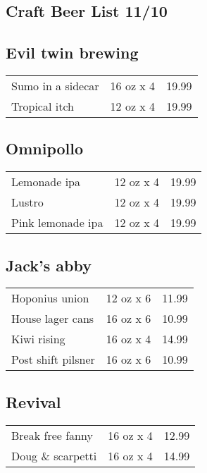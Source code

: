 \documentclass{article}%
\begin{document}
%
\pagestyle{empty}%
\normalsize%
%
\setlength{\columnseprule}{0.5pt}%
\setlength{\columnsep}{1cm}%
\renewcommand{\familydefault}{\sfdefault}%
\sffamily%
\begin{multicols}{3}%
\section*{\selectfont Craft Beer List 11/10}%

%
\subsection*{Evil twin brewing}%
\begin{tabular}{l c r}%
Sumo in a sidecar&16 oz x 4&19.99\\%
Tropical itch&12 oz x 4&19.99\\%
\end{tabular}

%
\subsection*{Omnipollo}%
\begin{tabular}{l c r}%
Lemonade ipa&12 oz x 4&19.99\\%
Lustro&12 oz x 4&19.99\\%
Pink lemonade ipa&12 oz x 4&19.99\\%
\end{tabular}

%
\subsection*{Jack's abby}%
\begin{tabular}{l c r}%
Hoponius union&12 oz x 6&11.99\\%
House lager cans&16 oz x 6&10.99\\%
Kiwi rising&16 oz x 4&14.99\\%
Post shift pilsner&16 oz x 6&10.99\\%
\end{tabular}

%
\subsection*{Revival}%
\begin{tabular}{l c r}%
Break free fanny&16 oz x 4&12.99\\%
Doug \& scarpetti&16 oz x 4&14.99\\%
\end{tabular}


\end{multicols}
\end{document}
